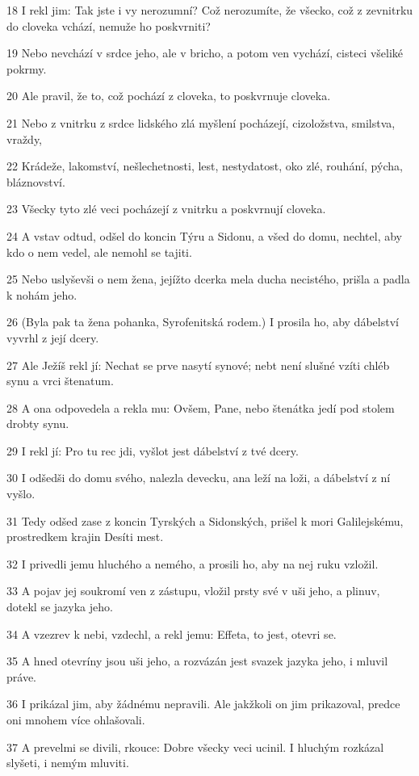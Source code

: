 \par 18 I rekl jim: Tak jste i vy nerozumní? Což nerozumíte, že všecko, což z zevnitrku do cloveka vchází, nemuže ho poskvrniti?
\par 19 Nebo nevchází v srdce jeho, ale v bricho, a potom ven vychází, cisteci všeliké pokrmy.
\par 20 Ale pravil, že to, což pochází z cloveka, to poskvrnuje cloveka.
\par 21 Nebo z vnitrku z srdce lidského zlá myšlení pocházejí, cizoložstva, smilstva, vraždy,
\par 22 Krádeže, lakomství, nešlechetnosti, lest, nestydatost, oko zlé, rouhání, pýcha, bláznovství.
\par 23 Všecky tyto zlé veci pocházejí z vnitrku a poskvrnují cloveka.
\par 24 A vstav odtud, odšel do koncin Týru a Sidonu, a všed do domu, nechtel, aby kdo o nem vedel, ale nemohl se tajiti.
\par 25 Nebo uslyševši o nem žena, jejížto dcerka mela ducha necistého, prišla a padla k nohám jeho.
\par 26 (Byla pak ta žena pohanka, Syrofenitská rodem.) I prosila ho, aby dábelství vyvrhl z její dcery.
\par 27 Ale Ježíš rekl jí: Nechat se prve nasytí synové; nebt není slušné vzíti chléb synu a vrci štenatum.
\par 28 A ona odpovedela a rekla mu: Ovšem, Pane, nebo štenátka jedí pod stolem drobty synu.
\par 29 I rekl jí: Pro tu rec jdi, vyšlot jest dábelství z tvé dcery.
\par 30 I odšedši do domu svého, nalezla devecku, ana leží na loži, a dábelství z ní vyšlo.
\par 31 Tedy odšed zase z koncin Tyrských a Sidonských, prišel k mori Galilejskému, prostredkem krajin Desíti mest.
\par 32 I privedli jemu hluchého a nemého, a prosili ho, aby na nej ruku vzložil.
\par 33 A pojav jej soukromí ven z zástupu, vložil prsty své v uši jeho, a plinuv, dotekl se jazyka jeho.
\par 34 A vzezrev k nebi, vzdechl, a rekl jemu: Effeta, to jest, otevri se.
\par 35 A hned otevríny jsou uši jeho, a rozvázán jest svazek jazyka jeho, i mluvil práve.
\par 36 I prikázal jim, aby žádnému nepravili. Ale jakžkoli on jim prikazoval, predce oni mnohem více ohlašovali.
\par 37 A prevelmi se divili, rkouce: Dobre všecky veci ucinil. I hluchým rozkázal slyšeti, i nemým mluviti.

